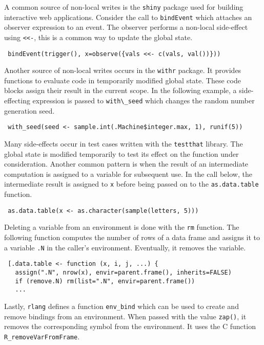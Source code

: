 \documentclass[review,nonacm,screen,acmsmall,anonymous=true]{acmart}
\newcommand{\code}[1]{\lstinline |#1|\xspace}
\renewcommand{\c}[1]{\lstinline |#1|\xspace}
\begin{document}
A common source of non-local writes is the \c{shiny} package used for building
interactive web applications. Consider the call to \code{bindEvent} which
attaches an observer expression to an event. The observer performs a non-local
side-effect using \code{<<-}, this is a common way to update the global state.
%
\begin{lstlisting}
 bindEvent(trigger(), x=observe({vals <<- c(vals, val())}))
\end{lstlisting}
%
\noindent
Another source of non-local writes occurs in the \code{withr} package. It
provides functions to evaluate code in temporarily modified global state. These
code blocks assign their result in the current scope. In the following example, a
side-effecting expression is passed to \code{with\_seed} which changes the
random number generation seed.
%
\begin{lstlisting}
 with_seed(seed <- sample.int(.Machine$integer.max, 1), runif(5))
\end{lstlisting}
%
\noindent
Many side-effects occur in test cases written with the \code{testthat} library.
The global state is modified temporarily to test its effect on the function
under consideration.
%
Another common pattern is when the result of an intermediate computation is
assigned to a variable for subsequent use. In the call below, the intermediate
result is assigned to \code{x} before being passed on to the
\code{as.data.table} function.
%
\begin{lstlisting}
 as.data.table(x <- as.character(sample(letters, 5)))
\end{lstlisting}
%
\noindent
Deleting a variable from an environment is done with the \code{rm} function.
The following function computes the number of rows of a data frame and assigns
it to a variable \code{.N} in the caller's environment. Eventually, it removes the
variable.
%
\begin{lstlisting}
 [.data.table <- function (x, i, j, ...) {
   assign(".N", nrow(x), envir=parent.frame(), inherits=FALSE)
   if (remove.N) rm(list=".N", envir=parent.frame())
   ...
\end{lstlisting}
\noindent
Lastly, \code{rlang} defines a function \code{env_bind} which can be used to
create and remove bindings from an environment. When passed with the value
\code{zap()}, it removes the corresponding symbol from the environment. It uses
the C function \code{R_removeVarFromFrame}.
\end{document}
